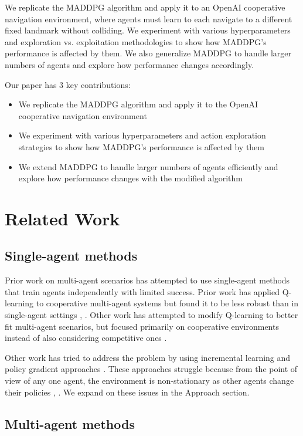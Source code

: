 \documentclass{article}
\begin{document}
We replicate the MADDPG algorithm and apply it to an OpenAI cooperative navigation environment, where agents must learn to each navigate to a different fixed landmark without colliding. We experiment with various hyperparameters and exploration vs. exploitation methodologies to show how MADDPG's performance is affected by them. We also generalize MADDPG to handle larger numbers of agents and explore how performance changes accordingly.

Our paper has 3 key contributions:
\begin{itemize}[nosep]
\item We replicate the MADDPG algorithm and apply it to the OpenAI cooperative navigation environment
\item We experiment with various hyperparameters and action exploration strategies to show how MADDPG's performance is affected by them
\item We extend MADDPG to handle larger numbers of agents efficiently and explore how performance changes with the modified algorithm
\end{itemize}

\section{Related Work}
\subsection{Single-agent methods}
Prior work on multi-agent scenarios has attempted to use single-agent methods that train agents independently with limited success. Prior work has applied Q-learning to cooperative multi-agent systems but found it to be less robust than in single-agent settings \cite{sandholm1996}, \cite{claus1998dynamics}. Other work has attempted to modify Q-learning to better fit multi-agent scenarios, but focused primarily on cooperative environments instead of also considering competitive ones \cite{cooperativeQ}.

Other work has tried to address the problem by using incremental learning and policy gradient approaches \cite{buffet2007}. These approaches struggle because from the point of view of any one agent, the environment is non-stationary as other agents change their policies \cite{busoniu2008comprehensive}, \cite{bucsoniu2010multi}. We expand on these issues in the Approach section.

\subsection{Multi-agent methods}
\end{document}
